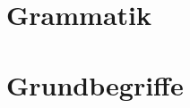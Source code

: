 \documentclass[handout,aspectratio=1610,dvipsnames]{beamer}
\begin{document}
  \section[Grammatik]{Grammatik}
  \let\woopsi\section\let\section\subsection\let\subsection\subsubsection
  
  \let\subsection\section\let\section\woopsi

  \section[Grundbegriffe]{Grundbegriffe}
  \let\woopsi\section\let\section\subsection\let\subsection\subsubsection
  
  \let\subsection\section\let\section\woopsi
\end{document}
